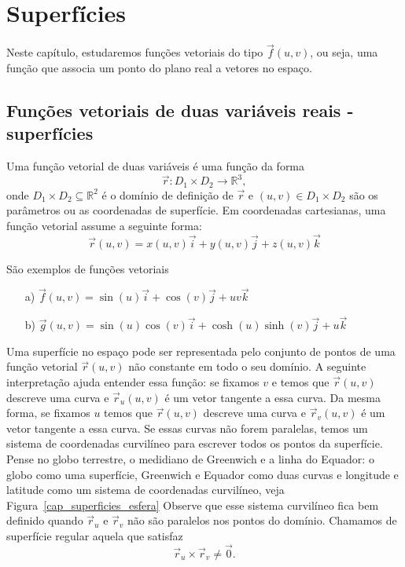 \chapter{Superfícies}
Neste capítulo, estudaremos funções vetoriais do tipo $\vec{f}(u,v)$, ou seja, uma função que associa um ponto do plano real a vetores no espaço.
\section{Funções vetoriais de duas variáveis reais - superfícies}
Uma função vetorial de duas variáveis é uma função da forma $$\vec{r}:D_1\times D_2 \to \mathbb{R}^3,$$ onde $D_1\times D_2\subseteq \mathbb{R}^2$ é o domínio de definição de $\vec{r}$ e $(u,v)\in D_1\times D_2$ são os parâmetros ou as coordenadas de superfície. Em coordenadas cartesianas, uma função vetorial assume a seguinte forma:
$$\vec{r}(u,v)=x(u,v)\vec{i}+y(u,v)\vec{j}+z(u,v)\vec{k}$$
\begin{ex}\label{exfv_1} São exemplos de funções vetoriais
\begin{itemize}
\item [a)] $\vec{f}(u,v)=\sin(u)\vec{i}+\cos(v)\vec{j}+uv\vec{k}$
\item [b)] $\vec{g}(u,v)=\sin(u)\cos(v) \vec{i}+\cosh(u)\sinh(v)\vec{j}+u\vec{k}$
\end{itemize}
\end{ex}
Uma superfície no espaço pode ser representada pelo conjunto de pontos de uma função vetorial $\vec{r}(u,v)$ não constante em todo o seu domínio. A seguinte interpretação ajuda entender essa função: se fixamos $v$ e temos que $\vec{r}(u,v)$ descreve uma curva e $\vec{r}_u(u,v)$ é um vetor tangente a essa curva. Da mesma forma, se fixamos $u$ temos que $\vec{r}(u,v)$ descreve uma curva e $\vec{r}_v(u,v)$ é um vetor tangente a essa curva. Se essas curvas não forem paralelas, temos um sistema de coordenadas curvilíneo para escrever todos os pontos da superfície. Pense no globo terrestre, o medidiano de Greenwich e a linha do Equador: o globo como uma superfície, Greenwich e Equador como duas curvas e longitude e latitude como um sistema de coordenadas curvilíneo, veja Figura~\ref{cap_superficies_esfera} Observe que esse sistema curvilíneo fica bem definido quando $\vec{r}_u$ e $\vec{r}_v$ não são paralelos nos pontos do domínio. Chamamos de superfície regular aquela que satisfaz
$$
\vec{r}_u\times \vec{r}_v\neq \vec{0}.
$$
